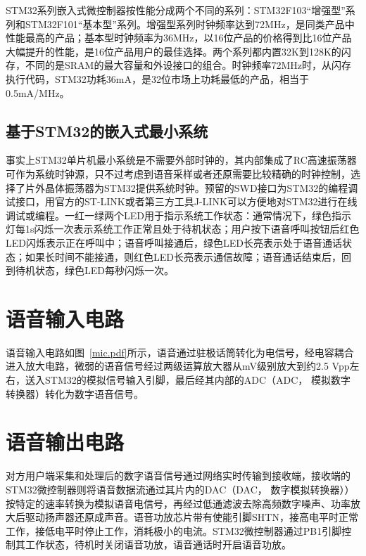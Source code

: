 STM32系列嵌入式微控制器按性能分成两个不同的系列：STM32F103“增强型”系列和STM32F101“基本型”系列。增强型系列时钟频率达到72MHz，是同类产品中性能最高的产品；基本型时钟频率为36MHz，以16位产品的价格得到比16位产品大幅提升的性能，是16位产品用户的最佳选择。两个系列都内置32K到128K的闪存，不同的是SRAM的最大容量和外设接口的组合。时钟频率72MHz时，从闪存执行代码，STM32功耗36mA，是32位市场上功耗最低的产品，相当于0.5mA/MHz。

\subsection{基于STM32的嵌入式最小系统}
事实上STM32单片机最小系统是不需要外部时钟的，其内部集成了RC高速振荡器可作为系统时钟源，只不过考虑到语音采样或者还原需要比较精确的时钟控制，选择了片外晶体振荡器为STM32提供系统时钟。预留的SWD接口为STM32的编程调试接口，用官方的ST-LINK或者第三方工具J-LINK可以方便地对STM32进行在线调试或编程。一红一绿两个LED用于指示系统工作状态：通常情况下，绿色指示灯每1s闪烁一次表示系统工作正常且处于待机状态；用户按下语音呼叫按钮后红色LED闪烁表示正在呼叫中；语音呼叫接通后，绿色LED长亮表示处于语音通话状态；如果长时间不能接通，则红色LED长亮表示通信故障；语音通话结束后，回到待机状态，绿色LED每秒闪烁一次。

\section{语音输入电路}
语音输入电路如图~\ref{mic.pdf}所示，语音通过驻极话筒转化为电信号，经电容耦合进入放大电路，微弱的语音信号经过两级运算放大器从mV级别放大到约2.5 Vpp左右，送入STM32的模拟信号输入引脚，最后经其内部的ADC（\acrlong{ADC}， 模拟数字转换器）转化为数字语音信号。

\section{语音输出电路}
对方用户端采集和处理后的数字语音信号通过网络实时传输到接收端，接收端的STM32微控制器则将语音数据流通过其片内的DAC（\acrlong{DAC}， 数字模拟转换器））按特定的速率转换为模拟语音电信号，再经过低通滤波去除高频数字噪声、功率放大后驱动扬声器还原成声音。语音功放芯片带有使能引脚SHTN，接高电平时正常工作，接低电平时停止工作，消耗极小的电流。STM32微控制器通过PB1引脚控制其工作状态，待机时关闭语音功放，语音通话时开启语音功放。

